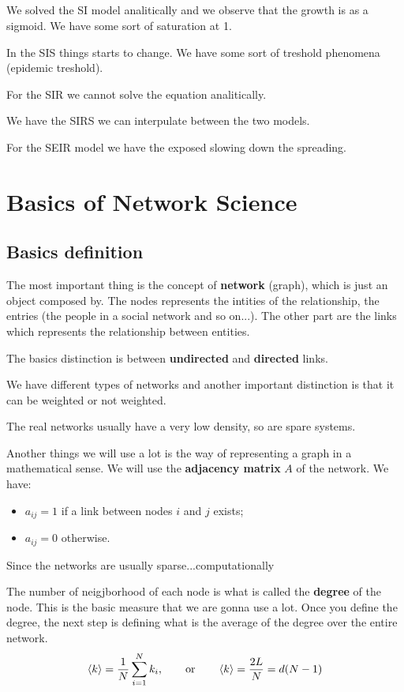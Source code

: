 \documentclass[../main/main.tex]{subfiles}
\begin{document}
\section{}
We solved the SI model analitically and we observe that the growth is as a sigmoid. We have some sort of saturation at 1.

In the SIS things starts to change. We have some sort of treshold phenomena (epidemic treshold).

For the SIR we cannot solve the equation analitically.

We have the SIRS we can interpulate between the two models.

For the SEIR model we have the exposed slowing down the spreading.


\chapter{Basics of Network Science}

\section{Basics definition}

The most important thing is the concept of \textbf{network} (graph), which is just an object composed by.
The nodes represents the intities of the relationship, the entries (the people in a social network and so on...).  The other part are the links which represents the relationship between entities.

The basics distinction is between \textbf{undirected} and \textbf{directed} links.

We have different types of networks and another important distinction is that it can be weighted or not weighted.

The real networks usually have a very low density, so are spare systems.

Another things we will use a lot is the way of representing a graph in a mathematical sense. We will use the \textbf{adjacency matrix} \( A \) of the network. We have:
\begin{itemize}
\item \( a_{ij} = 1 \) if a link between nodes \( i \) and \( j \) exists;
\item \( a_{ij} = 0 \) otherwise.
\end{itemize}
Since the networks are usually sparse...computationally

The number of neigjborhood of each node is what is called the \textbf{degree} of the node. This is the basic measure that we are gonna use a lot. Once you define the degree, the next step is defining what is the average of the degree over the entire network.
\begin{equation*}
  \expval{k} = \frac{1}{N} \sum_{i=1}^{N} k_i, \qquad \text{or} \qquad \expval{k} = \frac{2L}{N} = d(N-1)
\end{equation*}
\end{document}
